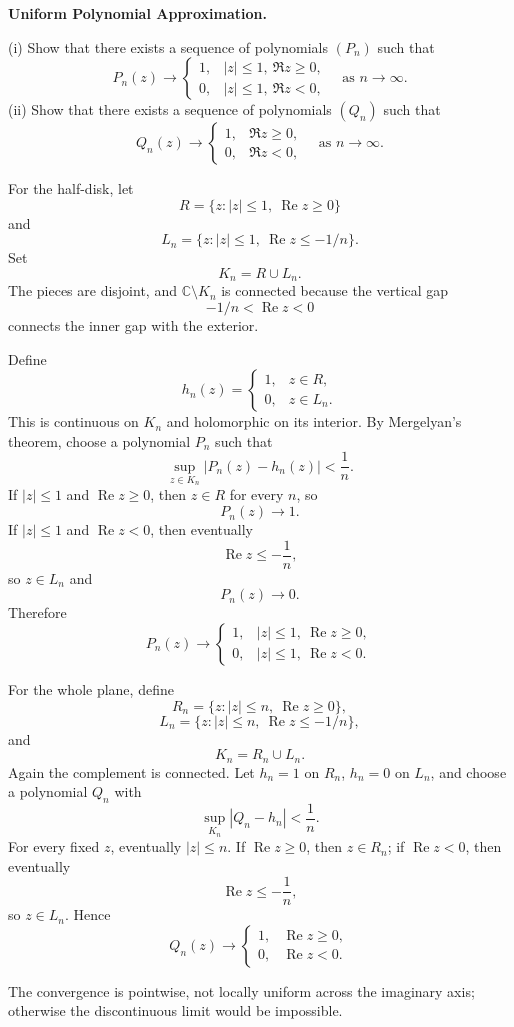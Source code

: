 \begin{problem}[CP-II-0504]
\label{prob:cp-ii-0504}
\textbf{Uniform Polynomial Approximation.}

	(i) Show that there exists a sequence of polynomials $(P_n)$ such that
	\[
	P_n(z)\longrightarrow
	\begin{cases}
		1,& |z|\le 1,\ \Re z\ge 0,\\[2pt]
		0,& |z|\le 1,\ \Re z<0,
	\end{cases}
	\quad\text{as }n\to\infty.
	\]
	(ii) Show that there exists a sequence of polynomials $(Q_n)$ such that
	\[
	Q_n(z)\longrightarrow
	\begin{cases}
		1,& \Re z\ge 0,\\[2pt]
		0,& \Re z<0,
	\end{cases}
	\quad\text{as }n\to\infty.
	\]
\end{problem}

\begin{solution}
For the half-disk, let
\[
R
=
\{z:|z|\le1,\ \operatorname{Re}z\ge0\}
\]
and
\[
L_n
=
\{z:|z|\le1,\ \operatorname{Re}z\le-1/n\}.
\]
Set
\[
K_n=R\cup L_n.
\]
The pieces are disjoint, and \(\mathbb C\setminus K_n\) is connected because the vertical
gap
\[
-1/n<\operatorname{Re}z<0
\]
connects the inner gap with the exterior.

Define
\[
h_n(z)
=
\begin{cases}
1,&z\in R,\\
0,&z\in L_n.
\end{cases}
\]
This is continuous on \(K_n\) and holomorphic on its interior. By Mergelyan's theorem, choose
a polynomial \(P_n\) such that
\[
\sup_{z\in K_n}|P_n(z)-h_n(z)|<\frac1n.
\]
If \(|z|\le1\) and \(\operatorname{Re}z\ge0\), then \(z\in R\) for every \(n\), so
\[
P_n(z)\to1.
\]
If \(|z|\le1\) and \(\operatorname{Re}z<0\), then eventually
\[
\operatorname{Re}z\le-\frac1n,
\]
so \(z\in L_n\) and
\[
P_n(z)\to0.
\]
Therefore
\[
\boxed{
P_n(z)\to
\begin{cases}
1,&|z|\le1,\ \operatorname{Re}z\ge0,\\
0,&|z|\le1,\ \operatorname{Re}z<0.
\end{cases}
}
\]

For the whole plane, define
\[
R_n=\{z:|z|\le n,\ \operatorname{Re}z\ge0\},
\]
\[
L_n=\{z:|z|\le n,\ \operatorname{Re}z\le-1/n\},
\]
and
\[
K_n=R_n\cup L_n.
\]
Again the complement is connected. Let \(h_n=1\) on \(R_n\), \(h_n=0\) on \(L_n\), and
choose a polynomial \(Q_n\) with
\[
\sup_{K_n}|Q_n-h_n|<\frac1n.
\]
For every fixed \(z\), eventually \(|z|\le n\). If \(\operatorname{Re}z\ge0\), then
\(z\in R_n\); if \(\operatorname{Re}z<0\), then eventually
\[
\operatorname{Re}z\le-\frac1n,
\]
so \(z\in L_n\). Hence
\[
\boxed{
Q_n(z)\to
\begin{cases}
1,&\operatorname{Re}z\ge0,\\
0,&\operatorname{Re}z<0.
\end{cases}
}
\]

The convergence is pointwise, not locally uniform across the imaginary axis; otherwise the
discontinuous limit would be impossible.
\end{solution}


